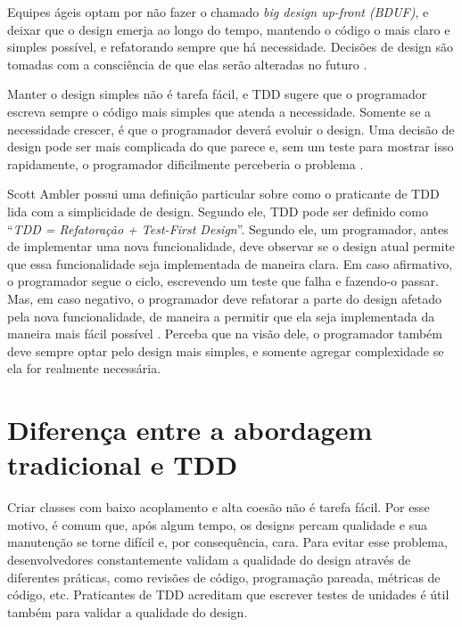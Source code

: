 Equipes ágeis optam por não fazer o chamado \textit{big design up-front (BDUF)},
e deixar que o design emerja ao longo do tempo, mantendo o código o mais claro e
simples possível, e refatorando sempre que há necessidade. Decisões de
design são tomadas com a consciência de que elas serão alteradas no futuro
\cite{is-design-dead}.

Manter o design simples não é tarefa fácil, e TDD sugere que o programador
escreva sempre o código mais simples que atenda a necessidade. Somente se a
necessidade crescer, é que o programador deverá evoluir o design. Uma decisão de
design pode ser mais complicada do que parece e, sem um teste para mostrar isso
rapidamente, o programador dificilmente perceberia o problema \cite{aim-fire}.

Scott Ambler possui uma definição particular sobre como o praticante de TDD lida
com a simplicidade de design. Segundo ele, TDD pode ser definido como
``\textit{TDD = Refatoração + Test-First Design}''. Segundo ele, um programador,
antes de implementar uma nova funcionalidade, deve observar se o design atual
permite que essa funcionalidade seja implementada de maneira clara. Em caso
afirmativo, o programador segue o ciclo, escrevendo um teste que falha e
fazendo-o passar. Mas, em caso negativo, o programador deve refatorar a parte do
design afetado pela nova funcionalidade, de maneira a permitir que ela seja
implementada da maneira mais fácil possível \cite{wambler-tdd}. Perceba que na
visão dele, o programador também deve sempre optar pelo design mais simples, e
somente agregar complexidade se ela for realmente necessária.

\section{Diferença entre a abordagem tradicional e TDD}
\label{sec:diferencas-tdd-e-tradicional}

Criar classes com baixo acoplamento e alta coesão não é tarefa fácil. Por esse
motivo, é comum que, após algum tempo, os designs percam qualidade e sua
manutenção se torne difícil e, por consequência, cara.
Para evitar esse problema, desenvolvedores constantemente validam a qualidade do
design através de diferentes práticas, como revisões de código, programação
pareada, métricas de código, etc. Praticantes de TDD acreditam que escrever
testes de unidades é útil também para validar a qualidade do design.

